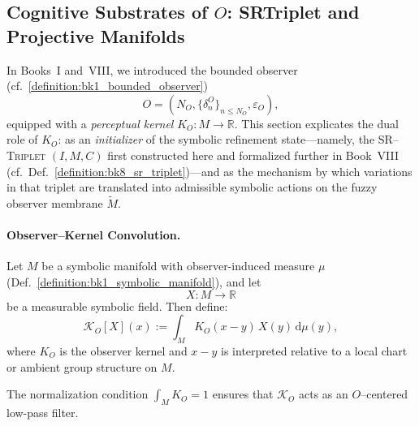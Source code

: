\subsection{\texorpdfstring{Cognitive Substrates of $O$}{Cognitive Substrates of O}: SR\textendash{}Triplet and Projective Manifolds}
\label{subsec:bk4_cognitive_substrates_of_o}

In Books~I and~VIII, we introduced the bounded observer (cf.~\ref{definition:bk1_bounded_observer})
\[
O = (N_O, \{\delta_n^O\}_{n \leq N_O}, \varepsilon_O),
\]
equipped with a \emph{perceptual kernel} $K_O \colon M \to \mathbb{R}$.
This section explicates the dual role of $K_O$: as an \emph{initializer}
of the symbolic refinement state---namely, the \textsc{SR--Triplet}
$(I, M, C)$ first constructed here and formalized further in Book~VIII (cf.~Def.~\ref{definition:bk8_sr_triplet})---and as the mechanism by which variations in that triplet are translated into admissible symbolic actions on the fuzzy observer membrane $\widetilde{M}$.

\paragraph{Observer--Kernel Convolution.}
\begin{definition}
\label{definition:bk4_observer_kernel_convolution_map}
Let $M$ be a symbolic manifold with observer-induced measure $\mu$
(Def.~\ref{definition:bk1_symbolic_manifold}), and let
\[
X \colon M \to \mathbb{R}
\]
be a measurable symbolic field. Then define:
\[
\mathcal{K}_O[X](x) := \int_M K_O(x - y)\, X(y)\, \mathrm{d}\mu(y),
\]
where $K_O$ is the observer kernel and $x - y$ is interpreted relative to a local chart or ambient group structure on $M$.

The normalization condition $\int_M K_O = 1$ ensures that $\mathcal{K}_O$
acts as an $O$--centered low-pass filter.
\end{definition}
